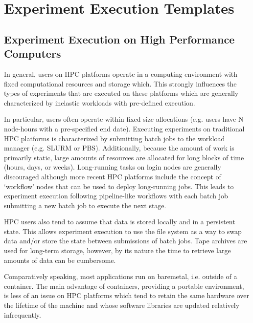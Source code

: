 
\section{Experiment Execution Templates}
\label{sec:templates}


\subsection{Experiment Execution on High Performance Computers}

In general, users on HPC platforms operate in a computing environment with fixed computational resources and storage which. This strongly influences the types of experiments that are executed on these platforms which are generally characterized by inelastic workloads with pre-defined execution.

In particular, users often operate within fixed size allocations (e.g. users have N node-hours with a pre-specified end date). Executing experiments on traditional HPC platforms is characterized by submitting batch jobs to the workload manager (e.g. SLURM or PBS). Additionally, because the amount of work is primarily static, large amounts of resources are allocated for long blocks of time (hours, days, or weeks). Long-running tasks on login nodes are generally discouraged although more recent HPC platforms include the concept of `workflow' nodes that can be used to deploy long-running jobs. This leads to experiment execution following pipeline-like workflows with each batch job submitting a new batch job to execute the next stage.

HPC users also tend to assume that data is stored locally and in a persistent state. This allows experiment execution to use the file system as a way to swap data and/or store the state between submissions of batch jobs. Tape archives are used for long-term storage, however, by its nature the time to retrieve large amounts of data can be cumbersome.

Comparatively speaking, most applications run on baremetal, i.e. outside of a container. The main advantage of containers, providing a portable environment, is less of an issue on HPC platforms which tend to retain the same hardware over the lifetime of the machine and whose software libraries are updated relatively infrequently.

